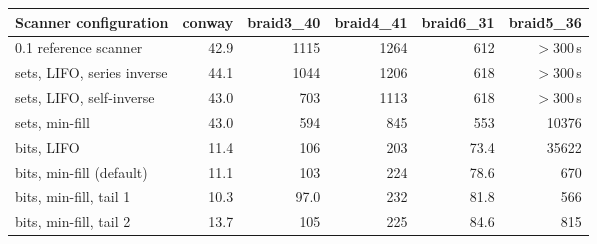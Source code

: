 \begin{tabular}{@{}lrrrrr@{}}
\toprule
Scanner configuration & conway & braid3\_40 & braid4\_41 & braid6\_31 & braid5\_36 \\
\midrule
0.1 reference scanner & 42.9 & 1115 & 1264 & 612 & $>$300\,s \\
sets, LIFO, series inverse & 44.1 & 1044 & 1206 & 618 & $>$300\,s \\
sets, LIFO, self-inverse & 43.0 & 703 & 1113 & 618 & $>$300\,s \\
sets, min-fill & 43.0 & 594 & 845 & 553 & 10376 \\
bits, LIFO & 11.4 & 106 & 203 & 73.4 & 35622 \\
bits, min-fill (default) & 11.1 & 103 & 224 & 78.6 & 670 \\
bits, min-fill, tail 1 & 10.3 & 97.0 & 232 & 81.8 & 566 \\
bits, min-fill, tail 2 & 13.7 & 105 & 225 & 84.6 & 815 \\
\bottomrule
\end{tabular}
